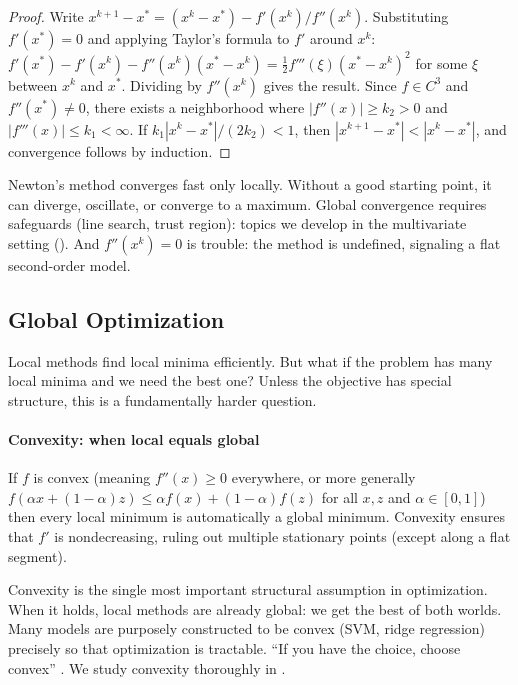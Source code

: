 \begin{proof}
	Write $x^{k+1} - x^* = (x^k - x^*) - f'(x^k)/f''(x^k)$.
	Substituting $f'(x^*) = 0$ and applying Taylor's formula to $f'$ around $x^k$:
	$f'(x^*) - f'(x^k) - f''(x^k)(x^* - x^k) = \frac{1}{2} f'''(\xi)(x^* - x^k)^2$
	for some $\xi$ between $x^k$ and $x^*$.
	Dividing by $f''(x^k)$ gives the result.
	Since $f \in C^3$ and $f''(x^*) \neq 0$, there exists a neighborhood where $|f''(x)| \geq k_2 > 0$ and $|f'''(x)| \leq k_1 < \infty$.
	If $k_1 |x^k - x^*| / (2 k_2) < 1$, then $|x^{k+1} - x^*| < |x^k - x^*|$, and convergence follows by induction.
\end{proof}

Newton's method converges fast only locally.
Without a good starting point, it can diverge, oscillate, or converge to a maximum.
Global convergence requires safeguards (line search, trust region): topics we develop in the multivariate setting ().
And $f''(x^k) = 0$ is trouble: the method is undefined, signaling a flat second-order model.


\subsection{Global Optimization}\label{sec:global-opt}

Local methods find local minima efficiently.
But what if the problem has many local minima and we need the best one?
Unless the objective has special structure, this is a fundamentally harder question.

\paragraph{Convexity: when local equals global}

\begin{theorem}\label{thm:convex-global}
	If $f$ is convex (meaning $f''(x) \geq 0$ everywhere, or more generally $f(\alpha x + (1-\alpha)z) \leq \alpha f(x) + (1-\alpha) f(z)$ for all $x, z$ and $\alpha \in [0,1]$) then every local minimum is automatically a global minimum.
	Convexity ensures that $f'$ is nondecreasing, ruling out multiple stationary points (except along a flat segment).
\end{theorem}

Convexity is the single most important structural assumption in optimization.
When it holds, local methods are already global: we get the best of both worlds.
Many models are purposely constructed to be convex (SVM, ridge regression) precisely so that optimization is tractable.
``If you have the choice, choose convex'' \cite{boyd2008}.
We study convexity thoroughly in .

